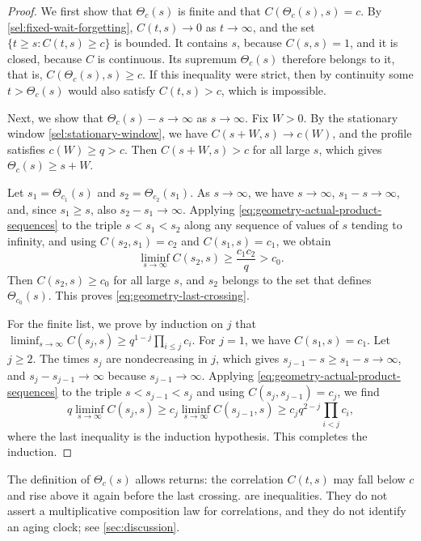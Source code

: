 \begin{proof}
We first show that $\Theta_c(s)$ is finite and that $C(\Theta_c(s),s)=c$. By \cref{sel:fixed-wait-forgetting}, $C(t,s)\to0$ as $t\to\infty$, and the set $\{t\ge s:C(t,s)\ge c\}$ is bounded. It contains $s$, because $C(s,s)=1$, and it is closed, because $C$ is continuous. Its supremum $\Theta_c(s)$ therefore belongs to it, that is, $C(\Theta_c(s),s)\ge c$. If this inequality were strict, then by continuity some $t>\Theta_c(s)$ would also satisfy $C(t,s)>c$, which is impossible.

Next, we show that $\Theta_c(s)-s\to\infty$ as $s\to\infty$. Fix $W>0$. By the stationary window \eqref{sel:stationary-window}, we have $C(s+W,s)\to c(W)$, and the profile satisfies $c(W)\ge q>c$. Then $C(s+W,s)>c$ for all large $s$, which gives $\Theta_c(s)\ge s+W$.

Let $s_1=\Theta_{c_1}(s)$ and $s_2=\Theta_{c_2}(s_1)$. As $s\to\infty$, we have $s\to\infty$, $s_1-s\to\infty$, and, since $s_1\ge s$, also $s_2-s_1\to\infty$. Applying \eqref{eq:geometry-actual-product-sequences} to the triple $s<s_1<s_2$ along any sequence of values of $s$ tending to infinity, and using $C(s_2,s_1)=c_2$ and $C(s_1,s)=c_1$, we obtain
\[
 \liminf_{s\to\infty}C(s_2,s)\ge\frac{c_1c_2}q>c_0 .
\]
Then $C(s_2,s)\ge c_0$ for all large $s$, and $s_2$ belongs to the set that defines $\Theta_{c_0}(s)$. This proves \eqref{eq:geometry-last-crossing}.

For the finite list, we prove by induction on $j$ that $\liminf_{s\to\infty}C(s_j,s)\ge q^{1-j}\prod_{i\le j}c_i$. For $j=1$, we have $C(s_1,s)=c_1$. Let $j\ge2$. The times $s_j$ are nondecreasing in $j$, which gives $s_{j-1}-s\ge s_1-s\to\infty$, and $s_j-s_{j-1}\to\infty$ because $s_{j-1}\to\infty$. Applying \eqref{eq:geometry-actual-product-sequences} to the triple $s<s_{j-1}<s_j$ and using $C(s_j,s_{j-1})=c_j$, we find
\[
 q\liminf_{s\to\infty}C(s_j,s)\ge c_j\liminf_{s\to\infty}C(s_{j-1},s)\ge c_jq^{2-j}\prod_{i<j}c_i ,
\]
where the last inequality is the induction hypothesis. This completes the induction.
\end{proof}

\begin{remark}\label{rem:geometry-last-crossing-scope}
The definition of $\Theta_c(s)$ allows returns: the correlation $C(t,s)$ may fall below $c$ and rise above it again before the last crossing.  are inequalities. They do not assert a multiplicative composition law for correlations, and they do not identify an aging clock; see \cref{sec:discussion}.
\end{remark}

